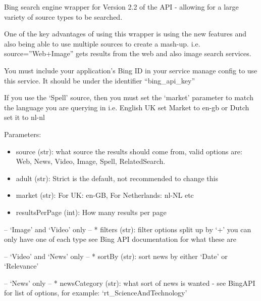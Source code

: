\documentclass[letterpaper,10pt,english]{sphinxmanual}
\begin{document}
\begin{fulllineitems}
\label{api3.0:puppy.search.engine.BingV2}
Bing search engine wrapper for Version 2.2 of the API - allowing for a large variety of source types to be searched.

One of the key advantages of using this wrapper is using the new features and also being able to use multiple sources to create a mash-up.
i.e. source=''Web+Image'' gets results from the web and also image search services.

You must include your application's Bing ID in your service manage config to use this service. It should be under the identifier ``bing\_api\_key''

If you use the `Spell' source, then you must set the `market' parameter to match the language you are querying in i.e. English UK set Market to en-gb or Dutch set it to nl-nl

Parameters:
\begin{itemize}
\item {} 
source (str): what source the results should come from, valid options are: Web, News, Video, Image, Spell, RelatedSearch.

\item {} 
adult (str):  Strict is the default, not recommended to change this

\item {} 
market (str): For UK: en-GB, For Netherlands: nl-NL etc

\item {} 
resultsPerPage (int): How many results per page

\end{itemize}

-- `Image' and `Video' only --
* filters (str): filter options split up by `+' you can only have one of each type see Bing API documentation for what these are

-- `Video' and `News' only --
* sortBy (str): sort news by either `Date' or `Relevance'

-- `News' only --
* newsCategory (str): what sort of news is wanted - see BingAPI for list of options, for example: `rt\_ScienceAndTechnology'

\end{fulllineitems}
\end{document}
